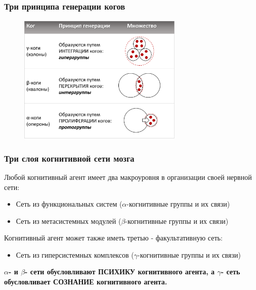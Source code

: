 \documentclass[default]{beamer}
\begin{document}
	\begin{frame}	
		\frametitle{Три принципа генерации когов}
		
		\begin{figure}
			\includegraphics[width=0.7\textwidth]{cog-types}
		\end{figure}
	\end{frame}

	\begin{frame}
		\frametitle{Три слоя когнитивной сети мозга}
		
		Любой когнитивный агент имеет два макроуровня в организации своей нервной сети:
		\begin{itemize}
			\item Сеть из функциональных систем ($\alpha$-когнитивные группы и их связи)
			\item Сеть из метасистемных модулей ($\beta$-когнитивные группы и их связи)
		\end{itemize}
		\par\bigskip
		Когнитивный агент может также иметь третью - факультативную сеть:
		\begin{itemize}
			\item Сеть из гиперсистемных комплексов ($\gamma$-когнитивные группы и их связи)
		\end{itemize}
		\par\bigskip
		\textbf{$\alpha$- и $\beta$- сети обусловливают ПСИХИКУ когнитивного агента, а $\gamma$- сеть обусловливает СОЗНАНИЕ когнитивного агента.}
	\end{frame}
\end{document}

